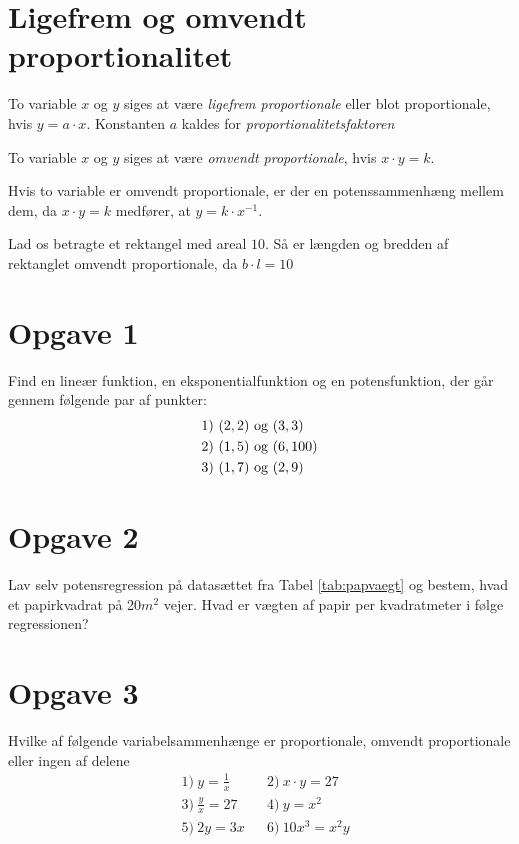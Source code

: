 \section*{Ligefrem og omvendt proportionalitet}
\begin{defn}
To variable $x$ og $y$ siges at være \textit{ligefrem proportionale} eller blot proportionale, hvis $y = a\cdot x$. Konstanten $a$ kaldes for \textit{proportionalitetsfaktoren} 
\end{defn}
\begin{defn}
To variable $x$ og $y$ siges at være \textit{omvendt proportionale}, hvis $x\cdot y = k$.
\end{defn}
Hvis to variable er omvendt proportionale, er der en potenssammenhæng mellem dem, da $x\cdot y = k$ medfører, at $y = k\cdot x^{-1}$.
\begin{exa}
Lad os betragte et rektangel med areal $10$. Så er længden og bredden af rektanglet omvendt proportionale, da $b\cdot l = 10$
\end{exa}
\section*{Opgave 1}
Find en lineær funktion, en eksponentialfunktion og en potensfunktion, der går gennem følgende par af punkter:
\begin{align*}
&1)\  (2,2)  \textnormal{ og }(3,3)\\
&2)\  (1,5)  \textnormal{ og }(6,100)\\
&3)\  (1,7)  \textnormal{ og }(2,9)\\
\end{align*}
\section*{Opgave 2}
Lav selv potensregression på datasættet fra Tabel \ref{tab:papvaegt} og bestem, hvad et papirkvadrat på 20$m^2$ vejer. Hvad er vægten af papir per kvadratmeter i følge regressionen?
\section*{Opgave 3}
Hvilke af følgende variabelsammenhænge er proportionale, omvendt proportionale eller ingen af delene
\begin{align*}
&1) \  y = \frac{1}{x} &&2) \  x\cdot y = 27    \\
&3) \ \frac{y}{x} = 27 &&4) \  y=x^2   \\
&5) \ 2y = 3x &&6) \ 10x^3 = x^2y    \\ 
\end{align*}